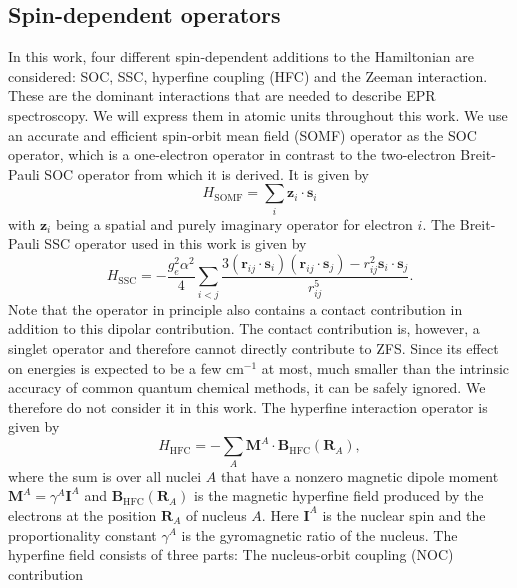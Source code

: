 \subsection{Spin-dependent operators}
\label{Sec:spindepop}
In this work, four different spin-dependent additions to the Hamiltonian are considered: SOC, SSC, hyperfine coupling (HFC) and the Zeeman interaction. These are the dominant interactions that are needed to describe EPR spectroscopy. We will express them in atomic units throughout this work.
We use an accurate and efficient spin-orbit mean field (SOMF) operator\cite{Neese_2005_34107} as the SOC operator, which is a one-electron operator in contrast to the two-electron Breit-Pauli SOC operator from which it is derived. It is given by
	\begin{equation}
	\label{Eq:HSOMF}
	{H_{{\text{SOMF}}}} = \sum\limits_i {{{\mathbf{z}}_i}}  \cdot {{\mathbf{s}}_i}
	\end{equation}
with ${{\mathbf{z}}_i}$ being a spatial and purely imaginary operator for electron $i$.\cite{Neese_2005_34107}
The Breit-Pauli SSC operator used in this work is given by\cite{McWee_1992_}
	\begin{equation}
	\label{Eq:HSSC}
	{H_{{\text{SSC}}}} =  - \frac{{g_e^2{\alpha ^2}}}{4}\sum\limits_{i < j} {\frac{{3({{\mathbf{r}}_{ij}} \cdot {{\mathbf{s}}_i})({{\mathbf{r}}_{ij}} \cdot {{\mathbf{s}}_j}) - r_{ij}^2{{\mathbf{s}}_i} \cdot {{\mathbf{s}}_j}}}{{r_{ij}^5}}}. 
	\end{equation}
Note that the operator in principle also contains a contact contribution in addition to this dipolar contribution. The contact contribution is, however, a singlet operator and therefore cannot directly contribute to ZFS. Since its effect on energies is expected to be a few cm$^{-1}$ at most, much smaller than the intrinsic accuracy of common quantum chemical methods, it can be safely ignored. We therefore do not consider it in this work.
The hyperfine interaction operator is given by
\begin{equation}
	\label{Eq:HHFC}
	{H_{{\text{HFC}}}} =  - \sum\limits_A {{{\mathbf{M}}^A}}  \cdot {{\mathbf{B}}_{{\text{HFC}}}}({{\mathbf{R}}_A}),
\end{equation} 	
where the sum is over all nuclei $A$ that have a nonzero magnetic dipole moment ${{\mathbf{M}}^A}={\gamma ^A}{{\mathbf{I}}^A}$ and ${{\mathbf{B}}_{{\text{HFC}}}}({{\mathbf{R}}_A})$ is the magnetic hyperfine field produced by the electrons at the position ${{\mathbf{R}}_A}$ of nucleus $A$. Here $\mathbf{I}^A$ is the nuclear spin and the proportionality constant ${\gamma ^A}$ is the gyromagnetic ratio of the nucleus. The hyperfine field consists of three parts: The nucleus-orbit coupling (NOC) contribution
